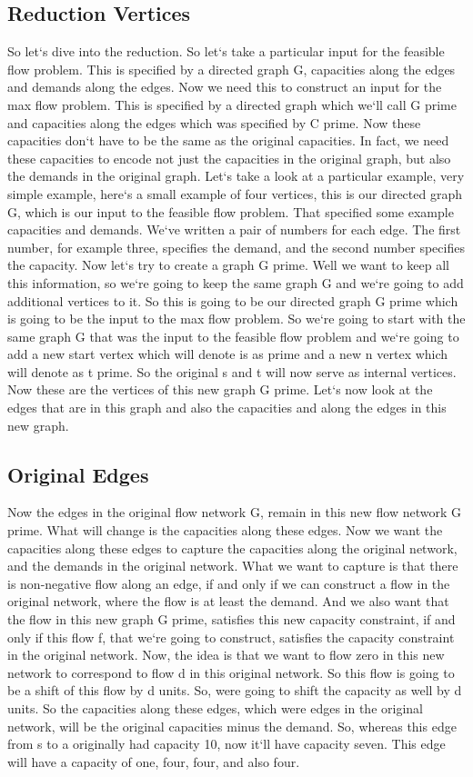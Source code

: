 \subsection{Reduction  Vertices}
So let`s dive into the reduction.
So let`s take a particular input for the feasible flow problem.
This is specified by a directed graph G, capacities along the edges and demands along the edges.
Now we need this to construct an input for the max flow problem.
This is specified by a directed graph which we`ll call G prime and capacities along the edges which was specified by C prime.
Now these capacities don`t have to be the same as the original capacities.
In fact, we need these capacities to encode not just the capacities in the original graph, but also the demands in the original graph.
Let`s take a look at a particular example, very simple example, here`s a small example of four vertices, this is our directed graph G, which is our input to the feasible flow problem.
That specified some example capacities and demands.
We`ve written a pair of numbers for each edge.
The first number, for example three, specifies the demand, and the second number specifies the capacity.
Now let`s try to create a graph G prime.
Well we want to keep all this information, so we`re going to keep the same graph G and we`re going to add additional vertices to it.
So this is going to be our directed graph G prime which is going to be the input to the max flow problem.
So we`re going to start with the same graph G that was the input to the feasible flow problem and we`re going to add a new start vertex which will denote is as prime and a new n vertex which will denote as t prime.
So the original s and t will now serve as internal vertices.
Now these are the vertices of this new graph G prime.
Let`s now look at the edges that are in this graph and also the capacities and along the edges in this new graph.

\subsection{Original Edges}
Now the edges in the original flow network G, remain in this new flow network G prime.
What will change is the capacities along these edges.
Now we want the capacities along these edges to capture the capacities along the original network, and the demands in the original network.
What we want to capture is that there is non-negative flow along an edge, if and only if we can construct a flow in the original network, where the flow is at least the demand.
And we also want that the flow in this new graph G prime, satisfies this new capacity constraint, if and only if this flow f, that we`re going to construct, satisfies the capacity constraint in the original network.
Now, the idea is that we want to flow zero in this new network to correspond to flow d in this original network.
So this flow is going to be a shift of this flow by d units.
So, were going to shift the capacity as well by d units.
So the capacities along these edges, which were edges in the original network, will be the original capacities minus the demand.
So, whereas this edge from s to a originally had capacity 10, now it`ll have capacity seven.
This edge will have a capacity of one, four, four, and also four.


